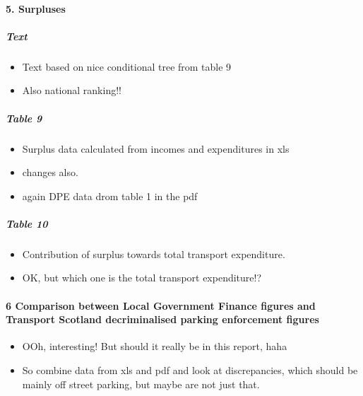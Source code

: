 \documentclass[]{article}
\providecommand{\tightlist}{%
  \setlength{\itemsep}{0pt}\setlength{\parskip}{0pt}}
\let\oldparagraph\paragraph
\renewcommand{\paragraph}[1]{\oldparagraph{#1}\mbox{}}
\let\oldsubparagraph\subparagraph
\renewcommand{\subparagraph}[1]{\oldsubparagraph{#1}\mbox{}}
\begin{document}
\hypertarget{surpluses}{%
\paragraph{5. Surpluses}\label{surpluses}}

\hypertarget{text-8}{%
\subparagraph{Text}\label{text-8}}

\begin{itemize}
\tightlist
\item
  Text based on nice conditional tree from table 9
\item
  Also national ranking!!
\end{itemize}

\hypertarget{table-9}{%
\subparagraph{Table 9}\label{table-9}}

\begin{itemize}
\tightlist
\item
  Surplus data calculated from incomes and expenditures in xls
\item
  changes also.
\item
  again DPE data drom table 1 in the pdf
\end{itemize}

\hypertarget{table-10}{%
\subparagraph{Table 10}\label{table-10}}

\begin{itemize}
\tightlist
\item
  Contribution of surplus towards total transport expenditure.
\item
  OK, but which one is the total transport expenditure!?
\end{itemize}

\hypertarget{comparison-between-local-government-finance-figures-and-transport-scotland-decriminalised-parking-enforcement-figures}{%
\paragraph{6 Comparison between Local Government Finance figures and
Transport Scotland decriminalised parking enforcement
figures}\label{comparison-between-local-government-finance-figures-and-transport-scotland-decriminalised-parking-enforcement-figures}}

\begin{itemize}
\tightlist
\item
  OOh, interesting! But should it really be in this report, haha
\item
  So combine data from xls and pdf and look at discrepancies, which
  should be mainly off street parking, but maybe are not just that.
\end{itemize}
\end{document}
